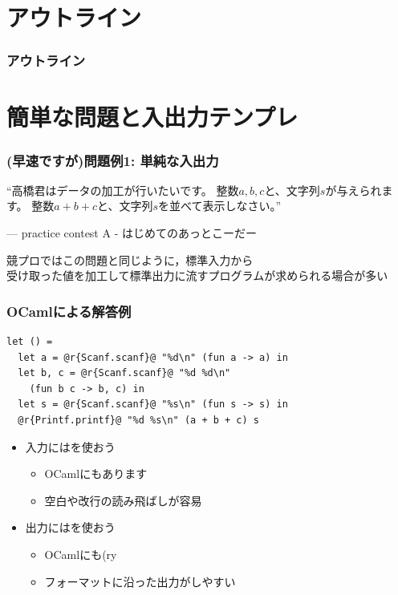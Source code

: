 \documentclass[dvipdfmx,cjk,xcolor=dvipsnames,envcountsect,notheorems,12pt]{beamer}
\theoremstyle{definition}
\begin{document}
\section*{アウトライン}

\begin{frame}
  \frametitle{アウトライン}
  \tableofcontents[sectionstyle=show,subsectionstyle=hide]
\end{frame}

\section{簡単な問題と入出力テンプレ}

\begin{frame}
	\frametitle{(早速ですが)問題例1: 単純な入出力}
	\begin{block}{}
		{\Large ``高橋君はデータの加工が行いたいです。
		整数$a,b,c$と、文字列$s$が与えられます。
		整数$a+b+c$と、文字列$s$を並べて表示しなさい。''}
		\begin{flushright}
			--- practice contest A - はじめてのあっとこーだー
		\end{flushright}
	\end{block}
	\vfill
	{\large 競プロではこの問題と同じように，標準入力から\\受け取った値を加工して標準出力に流すプログラムが求められる場合が多い}
\end{frame}

\begin{frame}[fragile]
	\frametitle{OCamlによる解答例}
	\begin{lstlisting}
let () =
  let a = @r{Scanf.scanf}@ "%d\n" (fun a -> a) in
  let b, c = @r{Scanf.scanf}@ "%d %d\n"
    (fun b c -> b, c) in
  let s = @r{Scanf.scanf}@ "%s\n" (fun s -> s) in
  @r{Printf.printf}@ "%d %s\n" (a + b + c) s
\end{lstlisting}
	\begin{itemize}
		\item 入力にはを使おう
			\begin{itemize}
				\item OCamlにもあります
				\item 空白や改行の読み飛ばしが容易
			\end{itemize}
		\item 出力にはを使おう
			\begin{itemize}
				\item OCamlにも(ry
				\item フォーマットに沿った出力がしやすい
			\end{itemize}
	\end{itemize}
\end{frame}
\end{document}

